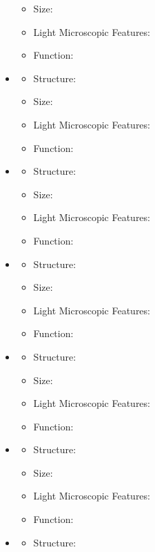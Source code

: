 \begin{itemize}
\begin{itemize}
    \item Size:
    \item Light Microscopic Features:
    \item Function:
  \end{itemize}
  \item {}
  \begin{itemize}
    \item Structure:
    \item Size:
    \item Light Microscopic Features:
    \item Function:
  \end{itemize}
  \item {}
  \begin{itemize}
    \item Structure:
    \item Size:
    \item Light Microscopic Features:
    \item Function:
  \end{itemize}
  \item {}
  \begin{itemize}
    \item Structure:
    \item Size:
    \item Light Microscopic Features:
    \item Function:
  \end{itemize}
  \item {}
  \begin{itemize}
    \item Structure:
    \item Size:
    \item Light Microscopic Features:
    \item Function:
  \end{itemize}
  \item {}
  \begin{itemize}
    \item Structure:
    \item Size:
    \item Light Microscopic Features:
    \item Function:
  \end{itemize}
  \item {}
  \begin{itemize}
    \item Structure:

\end{itemize}
\end{itemize}
